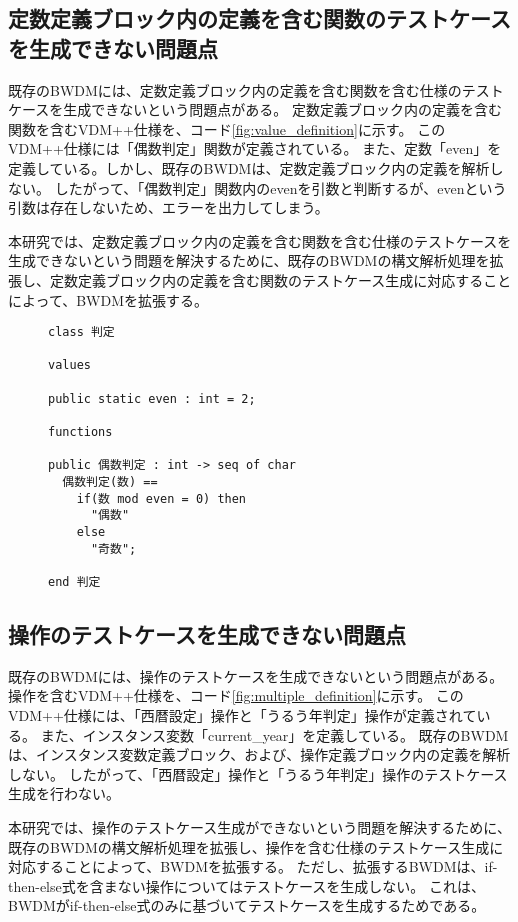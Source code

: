 \documentclass[uplatex, report, a4j, 10pt]{jsbook}
\newcommand{\tool}{BWDM}
\begin{document}
\subsection{定数定義ブロック内の定義を含む関数のテストケースを生成できない問題点}\label{sec:probrem_value}
既存の\tool{}には、定数定義ブロック内の定義を含む関数を含む仕様のテストケースを生成できないという問題点がある。
定数定義ブロック内の定義を含む関数を含むVDM++仕様を、コード\ref{fig:value_definition}に示す。
このVDM++仕様には「偶数判定」関数が定義されている。
また、定数「even」を定義している。しかし、既存のBWDMは、定数定義ブロック内の定義を解析しない。
したがって、「偶数判定」関数内のevenを引数と判断するが、evenという引数は存在しないため、エラーを出力してしまう。

本研究では、定数定義ブロック内の定義を含む関数を含む仕様のテストケースを生成できないという問題を解決するために、既存の\tool{}の構文解析処理を拡張し、定数定義ブロック内の定義を含む関数のテストケース生成に対応することによって、\tool{}を拡張する。

\lstset{language=}
\begin{figure}[tp]
  \begin{lstlisting}[caption=定数定義ブロック内の定義を含む関数を含むVDM++仕様,label=fig:value_definition]
class 判定

values

public static even : int = 2;

functions

public 偶数判定 : int -> seq of char
  偶数判定(数) ==
    if(数 mod even = 0) then
      "偶数"
    else
      "奇数";

end 判定
\end{lstlisting}
\end{figure}

\subsection{操作のテストケースを生成できない問題点}\label{sec:probrem_operation}
既存の\tool{}には、操作のテストケースを生成できないという問題点がある。
操作を含むVDM++仕様を、コード\ref{fig:multiple_definition}に示す。
このVDM++仕様には、「西暦設定」操作と「うるう年判定」操作が定義されている。
また、インスタンス変数「current\_year」を定義している。
既存のBWDMは、インスタンス変数定義ブロック、および、操作定義ブロック内の定義を解析しない。
したがって、「西暦設定」操作と「うるう年判定」操作のテストケース生成を行わない。

本研究では、操作のテストケース生成ができないという問題を解決するために、既存の\tool{}の構文解析処理を拡張し、操作を含む仕様のテストケース生成に対応することによって、\tool{}を拡張する。
ただし、拡張するBWDMは、if-then-else式を含まない操作についてはテストケースを生成しない。
これは、BWDMがif-then-else式のみに基づいてテストケースを生成するためである。
\end{document}
